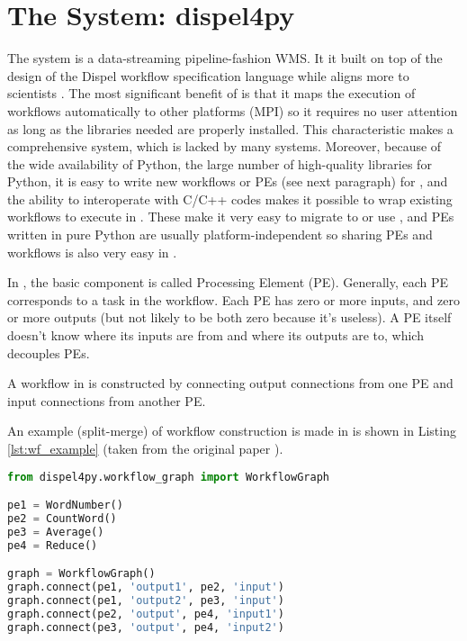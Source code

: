 \section{The System: dispel4py}
The \dpy system is a data-streaming pipeline-fashion WMS. It it built on top of the design of the Dispel workflow specification language \cite{atkinson2012data} while aligns more to scientists \cite{doi:10.1177/1094342016649766}. The most significant benefit of \dpy is that it maps the execution of workflows automatically to other platforms (\eg MPI) so it requires no user attention as long as the libraries needed are properly installed. This characteristic makes \dpy a comprehensive system, which is lacked by many systems. Moreover, because of the wide availability of Python, the large number of high-quality libraries for Python, it is easy to write new workflows or PEs (see next paragraph) for \dpy, and the ability to interoperate with C/C++ codes makes it possible to wrap existing workflows to execute in \dpy. These make it very easy to migrate to or use \dpy, and  PEs written in pure Python are usually platform-independent so sharing PEs and workflows is also very easy in \dpy.

In \dpy, the basic component is called Processing Element (PE). Generally, each PE corresponds to a task in the workflow. Each PE has zero or more inputs, and zero or more outputs (but not likely to be both zero because it's useless). A PE itself doesn't know where its inputs are from and where its outputs are to, which decouples PEs.

A workflow in \dpy is constructed by connecting output connections from one PE and input connections from another PE.

An example (split-merge) of workflow construction is made in \dpy is shown in Listing \ref{lst:wf_example} (taken from the original \dpy paper \cite{doi:10.1177/1094342016649766}).

\begin{lstlisting}[frame=single,caption={Example code of workflow construction in \dpy},captionpos=b,label={lst:wf_example},language=Python]
from dispel4py.workflow_graph import WorkflowGraph

pe1 = WordNumber()
pe2 = CountWord()
pe3 = Average()
pe4 = Reduce()

graph = WorkflowGraph()
graph.connect(pe1, 'output1', pe2, 'input')
graph.connect(pe1, 'output2', pe3, 'input')
graph.connect(pe2, 'output', pe4, 'input1')
graph.connect(pe3, 'output', pe4, 'input2')
\end{lstlisting}

